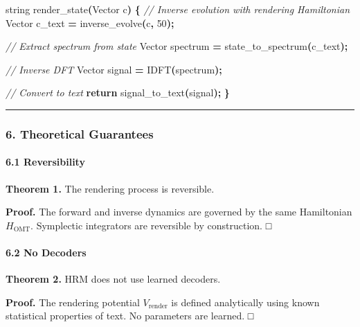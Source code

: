 \documentclass[
  11pt,
  a4paper,
]{article}
\newenvironment{Shaded}{\begin{snugshade}}{\end{snugshade}}
\newcommand{\CommentTok}[1]{\textcolor[rgb]{0.56,0.35,0.01}{\textit{#1}}}
\newcommand{\ControlFlowTok}[1]{\textcolor[rgb]{0.13,0.29,0.53}{\textbf{#1}}}
\newcommand{\DecValTok}[1]{\textcolor[rgb]{0.00,0.00,0.81}{#1}}
\newcommand{\NormalTok}[1]{#1}
\newcommand{\OperatorTok}[1]{\textcolor[rgb]{0.81,0.36,0.00}{\textbf{#1}}}
\begin{document}
\begin{Shaded}
\begin{Highlighting}[]
\NormalTok{string render\_state}\OperatorTok{(}\NormalTok{Vector c}\OperatorTok{)} \OperatorTok{\{}
    \CommentTok{// Inverse evolution with rendering Hamiltonian}
\NormalTok{    Vector c\_text }\OperatorTok{=}\NormalTok{ inverse\_evolve}\OperatorTok{(}\NormalTok{c}\OperatorTok{,} \DecValTok{50}\OperatorTok{);}
    
    \CommentTok{// Extract spectrum from state}
\NormalTok{    Vector spectrum }\OperatorTok{=}\NormalTok{ state\_to\_spectrum}\OperatorTok{(}\NormalTok{c\_text}\OperatorTok{);}
    
    \CommentTok{// Inverse DFT}
\NormalTok{    Vector signal }\OperatorTok{=}\NormalTok{ IDFT}\OperatorTok{(}\NormalTok{spectrum}\OperatorTok{);}
    
    \CommentTok{// Convert to text}
    \ControlFlowTok{return}\NormalTok{ signal\_to\_text}\OperatorTok{(}\NormalTok{signal}\OperatorTok{);}
\OperatorTok{\}}
\end{Highlighting}
\end{Shaded}

\begin{center}\rule{0.5\linewidth}{0.5pt}\end{center}

\subsubsection{6. Theoretical
Guarantees}\label{theoretical-guarantees-1}

\paragraph{6.1 Reversibility}\label{reversibility}

\textbf{Theorem 1.} The rendering process is reversible.

\textbf{Proof.} The forward and inverse dynamics are governed by the
same Hamiltonian \(H_{\text{OMT}}\). Symplectic integrators are
reversible by construction. □

\paragraph{6.2 No Decoders}\label{no-decoders}

\textbf{Theorem 2.} HRM does not use learned decoders.

\textbf{Proof.} The rendering potential \(V_{\text{render}}\) is defined
analytically using known statistical properties of text. No parameters
are learned. □
\end{document}
